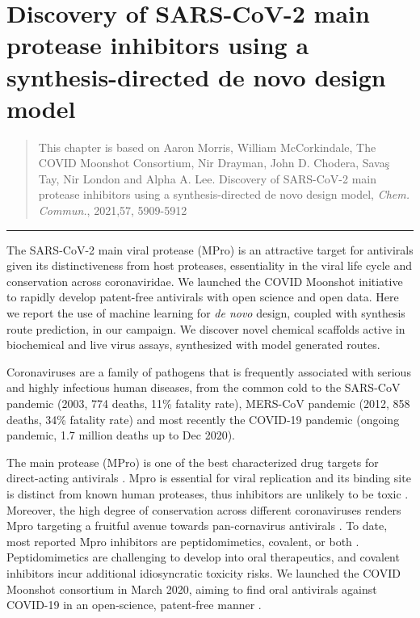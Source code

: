 \chapter{Discovery of SARS-CoV-2 main protease inhibitors using a synthesis-directed de novo design model}\label{ch:ranking}

\begin{quote}
    This chapter is based on Aaron Morris, William McCorkindale, The COVID Moonshot Consortium, Nir Drayman, John D. Chodera, Savaş Tay, Nir London and Alpha A. Lee. Discovery of SARS-CoV-2 main protease inhibitors using a synthesis-directed de novo design model, \textit{Chem. Commun.}, 2021,57, 5909-5912 
\end{quote}

\noindent\hfil\rule{0.5\textwidth}{.4pt}\hfil

The SARS-CoV-2 main viral protease (MPro) is an attractive target for antivirals given its distinctiveness from host proteases, essentiality in the viral life cycle and conservation across coronaviridae. We launched the COVID Moonshot initiative to rapidly develop patent-free antivirals with open science and open data. Here we report the use of machine learning for \emph{de novo} design, coupled with synthesis route prediction, in our campaign. We discover novel chemical scaffolds active in biochemical and live virus assays, synthesized with model generated routes.

Coronaviruses are a family of pathogens that is frequently associated with serious and highly infectious human diseases, from the common cold to the SARS-CoV pandemic (2003, 774 deaths, 11\% fatality rate), MERS-CoV pandemic (2012, 858 deaths, 34\% fatality rate) and most recently the COVID-19 pandemic (ongoing pandemic, 1.7 million deaths up to Dec 2020).

The main protease (MPro) is one of the best characterized drug targets for direct-acting antivirals \cite{pillaiyar2016overview,cannalire2020targeting}. Mpro is essential for viral replication and its binding site is distinct from known human proteases, thus inhibitors are unlikely to be toxic \cite{jin2020structure,liu2020development}. Moreover, the high degree of conservation across different coronaviruses renders Mpro targeting a fruitful avenue towards pan-cornavirus antivirals \cite{ullrich2020sars}. To date, most reported Mpro inhibitors are peptidomimetics, covalent, or both \cite{cannalire2020targeting}. Peptidomimetics are challenging to develop into oral therapeutics, and covalent inhibitors incur additional idiosyncratic toxicity risks. We launched the COVID Moonshot consortium in March 2020, aiming to find oral antivirals against COVID-19 in an open-science, patent-free manner \cite{chodera2020crowdsourcing}.

